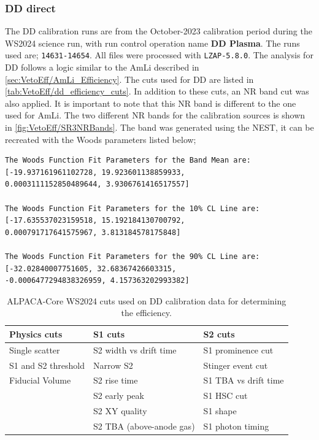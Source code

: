 \subsubsection{DD direct}
The DD calibration runs are from the October-2023 calibration period during the WS2024 science run, with run control operation name \textbf{DD Plasma}.
The runs used are; \lstinline{14631-14654}.
All files were processed with \lstinline{LZAP-5.8.0}.
The analysis for DD follows a logic similar to the AmLi described in \autoref{sec:VetoEff/AmLi_Efficiency}.
The cuts used for DD are listed in \autoref{tab:VetoEff/dd_efficiency_cuts}.
In addition to these cuts, an NR band cut was also applied.
It is important to note that this NR band is different to the one used for AmLi. The two different NR bands for the calibration sources is shown in \autoref{fig:VetoEff/SR3NRBands}.
The band was generated using the NEST, it can be recreated with the Woods parameters listed below;
\begin{lstlisting}[backgroundcolor = \color{lightgray}]
The Woods Function Fit Parameters for the Band Mean are:
[-19.937161961102728, 19.923601138859933,
0.0003111152850489644, 3.9306761416517557]

The Woods Function Fit Parameters for the 10% CL Line are:
[-17.635537023159518, 15.192184130700792,
0.000791717641575967, 3.813184578175848]

The Woods Function Fit Parameters for the 90% CL Line are:
[-32.02840007751605, 32.68367426603315,
-0.0006477294838326959, 4.157363202993382]
\end{lstlisting}
\begin{table}[!ht]
	\centering
	\caption{ALPACA-Core WS2024 cuts used on DD calibration data for determining the efficiency.}
	\begin{tabular}{lll}
    \hline\hline
	\textbf{Physics cuts}&\textbf{ S1 cuts}&\textbf{S2 cuts} \\
	\hline
	Single scatter & S2 width vs drift time & S1 prominence cut \\
	S1 and S2 threshold & Narrow S2 & Stinger event cut \\
	Fiducial Volume & S2 rise time & S1 TBA vs drift time \\
	& S2 early peak & S1 HSC cut \\
	& S2 XY quality & S1 shape \\
	& S2 TBA (above-anode gas) & S1 photon timing \\
    \hline\hline
	\end{tabular}
	\label{tab:VetoEff/dd_efficiency_cuts}
\end{table}
